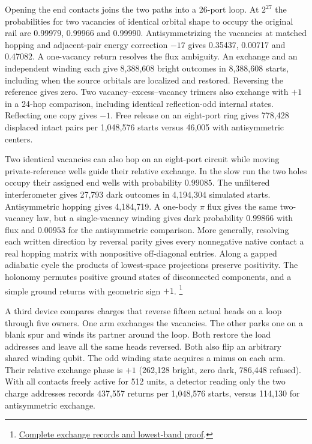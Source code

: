 Opening the end contacts joins the two paths into a 26-port loop. At
$2^{27}$ the probabilities for two vacancies of identical orbital shape
to occupy the original rail are 0.99979, 0.99966 and 0.99990.
Antisymmetrizing the vacancies at matched hopping and adjacent-pair
energy correction $-17$ gives 0.35437, 0.00717 and 0.47082. A
one-vacancy return resolves the flux ambiguity. An exchange and an
independent winding each give 8,388,608 bright outcomes in 8,388,608
starts, including when the source orbitals are localized and restored.
Reversing the reference gives zero. Two vacancy--excess--vacancy trimers
also exchange with $+1$ in a 24-hop comparison, including identical
reflection-odd internal states. Reflecting one copy gives $-1$. Free
release on an eight-port ring gives 778,428 displaced intact pairs
per 1,048,576 starts versus 46,005 with antisymmetric centers.

Two identical vacancies can also hop on an eight-port circuit while
moving private-reference wells guide their relative exchange. In the slow
run the two holes occupy their assigned end wells with probability $0.99085$.
The unfiltered interferometer gives 27,793 dark outcomes in 4,194,304
simulated starts. Antisymmetric hopping gives 4,184,719. A one-body
$\pi$ flux gives the same two-vacancy law, but a single-vacancy winding
gives dark probability $0.99866$ with flux and $0.00953$ for the
antisymmetric comparison. More generally, resolving each written
direction by reversal parity gives every nonnegative native contact
a real hopping matrix with nonpositive off-diagonal entries. Along a
gapped adiabatic cycle the products of lowest-space projections preserve
positivity. The holonomy permutes positive ground states of disconnected
components, and a simple ground returns with geometric sign $+1$.%
\footnote{\href{https://github.com/FloatingPragma/observer-patch-holography/tree/main/model/experiments/interval_echo_angular/charged_orientation/adiabatic_exchange}{Complete exchange records and lowest-band proof}.}

A third device compares charges that reverse fifteen actual heads on
a loop through five owners. One arm exchanges the vacancies. The other
parks one on a blank spur and winds its partner around the loop.
Both restore the load addresses and leave all the same heads reversed.
Both also flip an arbitrary shared winding qubit. The odd winding
state acquires a minus on each arm. Their relative exchange
phase is $+1$ (262,128 bright, zero dark, 786,448 refused).
With all contacts freely active for 512 units, a detector reading
only the two charge addresses records 437,557 returns per 1,048,576
starts, versus 114,130 for antisymmetric exchange.

